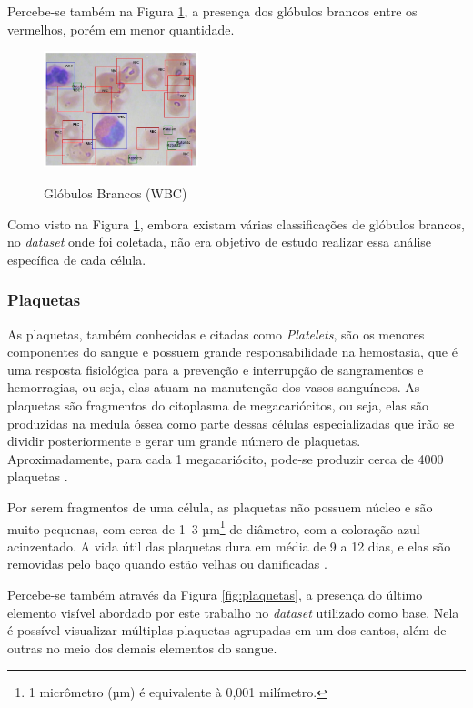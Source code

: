 Percebe-se também na Figura \ref{fig:wbc}, a presença dos glóbulos brancos entre os vermelhos, porém em menor quantidade.

\begin{figure}[!htb]
	\centering
	\caption{Glóbulos Brancos (WBC)}
	\includegraphics[width=0.40\textwidth]{img/wbc.jpg}
	\label{fig:wbc}
\end{figure}

Como visto na Figura \ref{fig:wbc}, embora existam várias classificações de glóbulos brancos, no \emph{dataset} onde foi coletada, não era objetivo de estudo realizar essa análise específica de cada célula.

\subsubsection{Plaquetas}
As plaquetas, também conhecidas e citadas como \emph{Platelets}, são os menores componentes do sangue e possuem grande responsabilidade na hemostasia, que é uma resposta fisiológica para a prevenção e interrupção de sangramentos e hemorragias, ou seja, elas atuam na manutenção dos vasos sanguíneos. As plaquetas são fragmentos do citoplasma de megacariócitos, ou seja, elas são produzidas na medula óssea como parte dessas células especializadas que irão se dividir posteriormente e gerar um grande número de plaquetas. Aproximadamente, para cada 1 megacariócito, pode-se produzir cerca de 4000 plaquetas \cite{abcOfCbc}.

Por serem fragmentos de uma célula, as plaquetas não possuem núcleo e são muito pequenas, com cerca de 1–3 µm\footnote[1]{1 micrômetro (µm) é equivalente à 0,001 milímetro.} de diâmetro, com a coloração azul-acinzentado. A vida útil das plaquetas dura em média de 9 a 12 dias, e elas são removidas pelo baço quando estão velhas ou danificadas \cite{abcOfCbc}.

Percebe-se também através da Figura \ref{fig:plaquetas}, a presença do último elemento visível abordado por este trabalho no \emph{dataset} utilizado como base. Nela é possível visualizar múltiplas plaquetas agrupadas em um dos cantos, além de outras no meio dos demais elementos do sangue.

